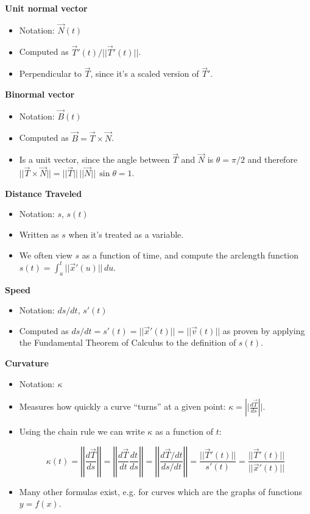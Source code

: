 \documentclass{ximera}
\begin{document}
\textbf{Unit normal vector}
\begin{itemize}
\item Notation: $\vec{N}(t)$%
\item Computed as $\vec{T}'(t) / ||\vec{T}'(t)||$.  
\item Perpendicular to $\vec{T}$, since it's a scaled version of $\vec{T}'$. 
\end{itemize}

\textbf{Binormal vector}
\begin{itemize}
\item Notation: $\vec{B}(t)$%
\item Computed as $\vec{B} = \vec{T} \times \vec {N}$.  
\item Is a unit vector, since the angle between $\vec{T}$ and $\vec{N}$ is $\theta=\pi/2$ and therefore $ ||\vec{T} \times \vec{N}|| = ||\vec{T}|| \, ||\vec{N}|| \, \sin \theta = 1 $.
\end{itemize}


\textbf{Distance Traveled}
\begin{itemize}
\item Notation: $s$, $s(t)$ 
\item Written as $s$ when it's treated as a variable.  
\item We often view $s$ as a function of time, and compute the arclength function
$ s(t) = \int_a^t ||\vec{x}'(u)|| \, du $.
\end{itemize}


\textbf{Speed}
\begin{itemize}
\item Notation: $ds/dt$, $s'(t)$
\item Computed as $ds/dt = s'(t) = ||\vec{x}'(t)||=||\vec{v}(t)||$ as proven by applying the Fundamental Theorem of Calculus to the definition of $s(t)$.
\end{itemize}

\textbf{Curvature}
\begin{itemize}
\item Notation: $\kappa$
\item Measures how quickly a curve ``turns'' at a given point: $\kappa = \left|| \frac{d\vec{T}}{ds} \right||$.  
\item Using the chain rule we can write $\kappa$ as a function of $t$:

\[ \kappa(t) = \left| \left| \frac{d\vec{T}}{ds} \right| \right| = \left| \left| \frac{d\vec{T}}{dt} \frac{dt}{ds} \right| \right| = 
\left| \left| \frac{d\vec{T}/dt}{ds/dt} \right| \right| = \frac{||\vec{T}'(t)||}{s'(t)} = \frac{||\vec{T}'(t)||}{||\vec{x}'(t)||} \]
\item Many other formulas exist, e.g. for curves which are the graphs of functions $y=f(x)$.
\end{itemize}
\end{document}
